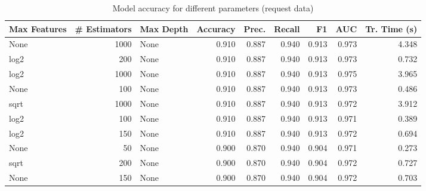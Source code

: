 \documentclass[
    fontsize=12pt,
    headings=small,
    parskip=half,           %
    bibliography=totoc,
    numbers=noenddot,       %
    open=any,               %
    final,                   %
    table
]{scrreprt}
\begin{document}
\begin{table}
    \begin{center}
        \begin{tabular}{lrlrrrrrr}
            \toprule Max Features & \# Estimators & Max Depth & Accuracy & Prec. & Recall & F1 & AUC & Tr. Time (s) \\
            \midrule
            None & 1000 & None & 0.910 & 0.887 & 0.940 & 0.913 & 0.973 & 4.348 \\
            log2 & 200 & None & 0.910 & 0.887 & 0.940 & 0.913 & 0.973 & 0.732 \\
            log2 & 1000 & None & 0.910 & 0.887 & 0.940 & 0.913 & 0.975 & 3.965 \\
            \rowcolor{green}
            None & 100 & None & 0.910 & 0.887 & 0.940 & 0.913 & 0.973 & 0.486 \\
            sqrt & 1000 & None & 0.910 & 0.887 & 0.940 & 0.913 & 0.972 & 3.912 \\
            log2 & 100 & None & 0.910 & 0.887 & 0.940 & 0.913 & 0.971 & 0.389 \\
            log2 & 150 & None & 0.910 & 0.887 & 0.940 & 0.913 & 0.972 & 0.694 \\
            None & 50 & None & 0.900 & 0.870 & 0.940 & 0.904 & 0.971 & 0.273 \\
            sqrt & 200 & None & 0.900 & 0.870 & 0.940 & 0.904 & 0.972 & 0.727 \\
            None & 150 & None & 0.900 & 0.870 & 0.940 & 0.904 & 0.972 & 0.703 \\
            \bottomrule
        \end{tabular}
    \end{center}
    \caption{Model accuracy for different parameters (request data)}
    \label{table:request_params}
\end{table}
\end{document}
